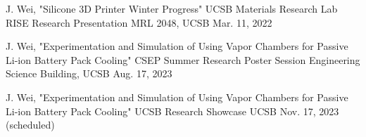 


\begin{cventries}

\cventry
{J. Wei, "Silicone 3D Printer Winter Progress"} %
{UCSB Materials Research Lab RISE Research Presentation} %
{MRL 2048, UCSB} %
{Mar. 11, 2022} %
{ %
\begin{cvitems}
\end{cvitems}
}

\cventry
{J. Wei, "Experimentation and Simulation of Using Vapor Chambers for Passive Li-ion Battery Pack Cooling"} %
{CSEP Summer Research Poster Session} %
{Engineering Science Building, UCSB} %
{Aug. 17, 2023} %
{ %
\begin{cvitems}
\end{cvitems}
}

\cventry
{J. Wei, "Experimentation and Simulation of Using Vapor Chambers for Passive Li-ion Battery Pack Cooling"} %
{UCSB Research Showcase} %
{UCSB} %
{Nov. 17, 2023 (scheduled)} %
{ %
\begin{cvitems}
\end{cvitems}
}


\end{cventries}